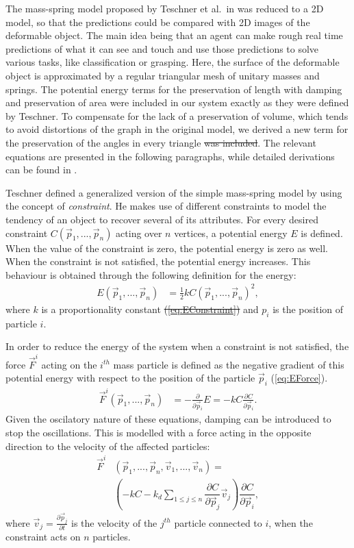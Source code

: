\documentclass[journal]{IEEEtran}
\newcommand{\eref}[1]{(\ref{#1})}
\newcommand{\comment}[1]{{\color{red} #1}}
\begin{document}
The mass-spring model proposed by Teschner et al.\ in \cite{Teschner2004} was reduced to a 2D model, so that the predictions could be compared with 2D images of the deformable object.  The main idea being that an agent can make rough real time predictions of what it can see and touch and use those predictions to solve various tasks, like classification or grasping.  Here, the surface of the deformable object is approximated by a regular triangular mesh of unitary masses and springs.  The potential energy terms for the preservation of length with damping and preservation of area were included in our system \comment{exactly as they were defined by Teschner}.  To compensate for the lack of a preservation of volume, which tends to avoid distortions of the graph \comment{in the original model}, \comment{we derived } a new term for the preservation of the angles \comment{in every triangle} \sout{was included}.  The relevant equations are presented in the following paragraphs, while detailed derivations can be found in \cite{Arriola2013thesis}.

\comment{Teschner defined a generalized version of the simple mass-spring model by using the concept of \emph{constraint}.  He makes use of different constraints to model the tendency of an object to recover several of its attributes.} For every desired constraint $C(\vec{p}_1,...,\vec{p}_{n})$ acting over $n$ vertices, a potential energy $E$ is defined.  When the value of the constraint is zero, the potential energy is zero as well.  When the constraint is not satisfied, the potential energy increases.  This behaviour is obtained through the following definition for the energy:
\begin{align}
 E(\vec{p}_1,...,\vec{p}_{n}) & = \frac{1}{2}kC(\vec{p}_1,...,\vec{p}_{n})^2, \label{eq:EConstraint}
\end{align}
where $k$ is a proportionality constant \sout{\eref{eq:EConstraint}} and $p_i$ is the position of particle $i$.

In order to reduce the energy of the system when a constraint is not satisfied, the force $\vec{F}^i$ acting on the $i^{th}$ mass particle is defined as the negative gradient of this potential energy with respect to the position of the particle $\vec{p}_i$ \eref{eq:EForce}.
\begin{align}
 \vec{F}^i(\vec{p}_1,...,\vec{p}_{n}) & = -\frac{\partial}{\partial \vec{p}_i}E = -kC\frac{\partial C}{\partial \vec{p}_i}. \label{eq:EForce}
\end{align}
Given the oscilatory nature of these equations, damping can be introduced to stop the oscillations.  This is modelled with a force acting in the opposite direction to the velocity of the affected particles:
\begin{align}
 \label{eq:Fdamping}
 \vec{F}^i&(\vec{p}_1,...,\vec{p}_{n},\vec{v}_1,...,\vec{v}_{n}) = \nonumber \\
    &\left( -kC-k_d\sum_{1 \le j \le n} \dfrac{\partial C}{\partial \vec{p}_j}\vec{v}_j \right)
 \dfrac{\partial C}{\partial \vec{p}_i},
\end{align}
where $\vec{v}_j = \frac{\partial \vec{p}_j}{\partial t}$ is the velocity of the $j^{th}$ particle connected to $i$, when the constraint acts on $n$ particles.
\end{document}

